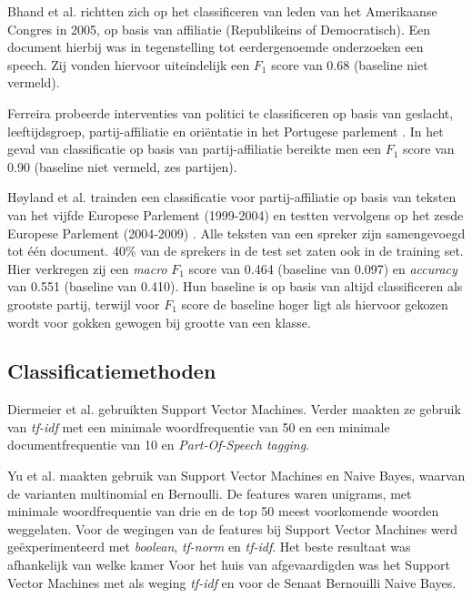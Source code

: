 Bhand et al. \cite{bhand} richtten zich op het classificeren van leden van het Amerikaanse Congres in 2005, op basis van affiliatie (Republikeins of Democratisch). Een document hierbij was in tegenstelling tot eerdergenoemde onderzoeken een speech. Zij vonden hiervoor uiteindelijk een $F_1$ score van 0.68 (baseline niet vermeld).\par

Ferreira \cite{Ferreira2016UsingTT} probeerde interventies van politici te classificeren op basis van geslacht, leeftijdsgroep, partij-affiliatie en oriëntatie in het Portugese parlement . In het geval van classificatie op basis van partij-affiliatie bereikte men een $F_1$ score van 0.90 (baseline niet vermeld, zes partijen).\par

Høyland et al. trainden een classificatie voor partij-affiliatie op basis van teksten van het vijfde Europese Parlement (1999-2004) en testten vervolgens op het zesde Europese Parlement (2004-2009) \cite{W14-2516}. Alle teksten van een spreker zijn samengevoegd tot één document. 40\% van de sprekers in de test set zaten ook in de training set. Hier verkregen zij een \textit{macro} $F_1$ score van 0.464 (baseline van 0.097) en \textit{accuracy} van 0.551 (baseline van 0.410). Hun baseline is op basis van altijd classificeren als grootste partij, terwijl voor $F_1$ score de baseline hoger ligt als hiervoor gekozen wordt voor gokken gewogen bij grootte van een klasse. \par

\subsection{Classificatiemethoden}
\label{sec:Deelvraag1}
Diermeier et al. \cite{diermeier_godbout_yu_kaufmann_2012} gebruikten Support Vector Machines. Verder maakten ze gebruik van \textit{tf-idf} met een minimale woordfrequentie van 50 en een minimale documentfrequentie van 10 en \textit{Part-Of-Speech tagging}.\par
Yu et al. \cite{doi:10.1080/19331680802149608} maakten gebruik van Support Vector Machines en Naive Bayes, waarvan de varianten multinomial en Bernoulli. De features waren unigrams, met minimale woordfrequentie van drie en de top 50 meest voorkomende woorden weggelaten. Voor de wegingen van de features bij Support Vector Machines werd geëxperimenteerd met \textit{boolean}, \textit{tf-norm} en \textit{tf-idf}. Het beste resultaat was afhankelijk van welke kamer Voor het huis van afgevaardigden was het Support Vector Machines met als weging \textit{tf-idf} en voor de Senaat Bernouilli Naive Bayes.

